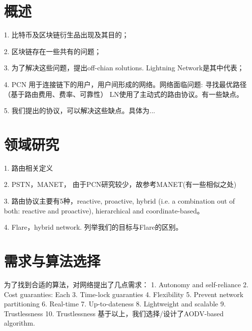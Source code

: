 \documentclass[12pt,a4paper]{article}
\begin{document}
\setlength{\parindent}{2em}



\tableofcontents
\clearpage

\section{概述}
1. 比特币及区块链衍生品出现及其目的；

2. 区块链存在一些共有的问题；

3. 为了解决这些问题，提出off-chian solutions. Lightning Network是其中代表；

4. PCN 用于连接链下的用户，用户间形成的网络。网络面临问题: 寻找最优路径（基于路由费用、费率、可靠性）
LN使用了主动式的路由协议。有一些缺点。

5. 我们提出的协议，可以解决这些缺点。具体为...

\section{领域研究}
1. 路由相关定义

2. PSTN，MANET，
由于PCN研究较少，故参考MANET(有一些相似之处)

3. 路由协议主要有5种，reactive, proactive, hybrid (i.e. a combination out of both: reactive and proactive), hierarchical and coordinate-based。

4. Flare，hybrid network. 列举我们的目标与Flare的区别。

\section{需求与算法选择}
为了找到合适的算法，对网络提出了几点需求：
1. Autonomy and self-reliance
2. Cost guaranties: Each
3. Time-lock guaranties
4. Flexibility
5. Prevent network partitioning
6. Real-time
7. Up-to-dateness
8. Lightweight and scalable
9. Trustlessness
10. Trustlessness
基于以上，我们选择/设计了AODV-based algorithm.
\end{document}
